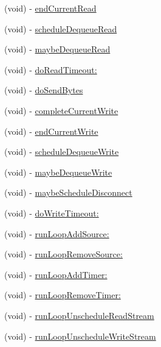 \begin{DoxyCompactItemize}
\item 
(void) -\/ \hyperlink{interface_async_t_c_p_socket_a7ddda9613a043ee3044c154ed877e750}{endCurrentRead}
\item 
(void) -\/ \hyperlink{interface_async_t_c_p_socket_aa81b3af01336161f5e1873103fde54d6}{scheduleDequeueRead}
\item 
(void) -\/ \hyperlink{interface_async_t_c_p_socket_a71ded98e88b1001fd651951a35654734}{maybeDequeueRead}
\item 
(void) -\/ \hyperlink{interface_async_t_c_p_socket_a91819574f3f9c4a0cb7ab2cebe9ae5d7}{doReadTimeout:}
\item 
(void) -\/ \hyperlink{interface_async_t_c_p_socket_aa52941df4ffcb97e6a2faeccb92cd714}{doSendBytes}
\item 
(void) -\/ \hyperlink{interface_async_t_c_p_socket_a1fed06588167a9defd9b6633c0606612}{completeCurrentWrite}
\item 
(void) -\/ \hyperlink{interface_async_t_c_p_socket_a468b9f90a54b420746956c45daa48d52}{endCurrentWrite}
\item 
(void) -\/ \hyperlink{interface_async_t_c_p_socket_ae7628474a26916d2edb61ea0c9544579}{scheduleDequeueWrite}
\item 
(void) -\/ \hyperlink{interface_async_t_c_p_socket_a185ab7cd6a129e604a01195589db6ea7}{maybeDequeueWrite}
\item 
(void) -\/ \hyperlink{interface_async_t_c_p_socket_a41c2a8e28e0f9f8499609e99ec5caaf2}{maybeScheduleDisconnect}
\item 
(void) -\/ \hyperlink{interface_async_t_c_p_socket_a15e28504239cb0c373cfcbb754d1260e}{doWriteTimeout:}
\item 
(void) -\/ \hyperlink{interface_async_t_c_p_socket_a75ababb9f489e363e2f2a0400a258508}{runLoopAddSource:}
\item 
(void) -\/ \hyperlink{interface_async_t_c_p_socket_a690225f977216c6c6fc151bb4ef43e36}{runLoopRemoveSource:}
\item 
(void) -\/ \hyperlink{interface_async_t_c_p_socket_acb0aace1fe5ef1c0452cad615451acfd}{runLoopAddTimer:}
\item 
(void) -\/ \hyperlink{interface_async_t_c_p_socket_a15eb41629b49b8efdd181cbe9fa11137}{runLoopRemoveTimer:}
\item 
(void) -\/ \hyperlink{interface_async_t_c_p_socket_a176545f228b7a3b60877d382cc91be29}{runLoopUnscheduleReadStream}
\item 
(void) -\/ \hyperlink{interface_async_t_c_p_socket_ac02c6980f3f278ae6f901b9e9fcf5f87}{runLoopUnscheduleWriteStream}

\end{DoxyCompactItemize}
